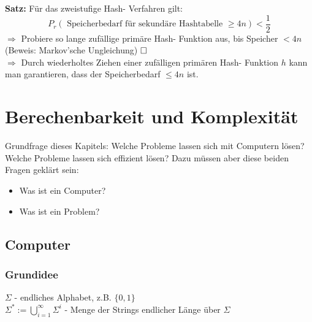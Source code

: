 \documentclass[fleqn]{scrartcl}
\begin{document}
\textbf{Satz:} Für das zweistufige Hash- Verfahren gilt:
\[P_r (\text{ Speicherbedarf für sekundäre Hashtabelle } \geq 4n) < \frac{1}{2}\]
$\Rightarrow$ Probiere so lange zufällige primäre Hash- Funktion aus, bis Speicher $ < 4n$ (Beweis: Markov'sche Ungleichung) $\hfill \Box$\\
$\Rightarrow$ Durch wiederholtes Ziehen einer zufälligen primären Hash- Funktion $h$ kann man garantieren, dass der Speicherbedarf $\leq 4n$ ist.

\newpage
\section{Berechenbarkeit und Komplexität}
Grundfrage dieses Kapitels: Welche Probleme lassen sich mit Computern lösen? Welche Probleme lassen sich effizient lösen? Dazu müssen aber diese beiden Fragen geklärt sein:
\begin{itemize}
\item Was ist ein Computer?
\item Was ist ein Problem?
\end{itemize}

\subsection{Computer}
\subsubsection{Grundidee}
\begin{center}
\end{center}
$\Sigma$ - endliches Alphabet, z.B. $\{0, 1\}$\\
$\Sigma^* := \bigcup\limits_{i = 1}^{\infty} \Sigma^i$ - Menge der Strings endlicher Länge über $\Sigma$\\
\end{document}
